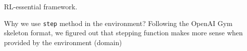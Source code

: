\documentclass[11pt]{article}
\begin{document}
RL-essential framework.

    Why we use \texttt{step} method in the environment?
Following the OpenAI Gym skeleton format, we figured out that stepping function makes more sense when provided by the
environment (domain)
\end{document}
